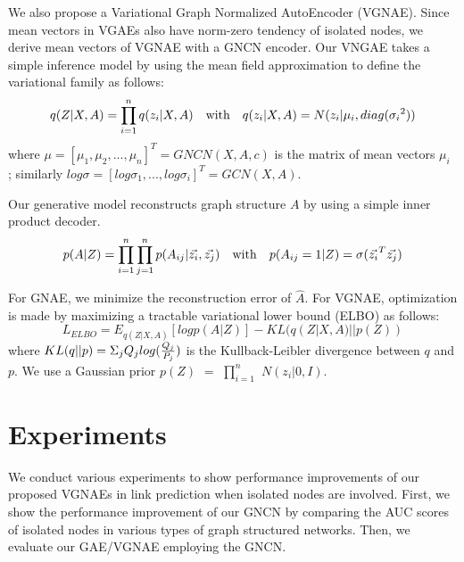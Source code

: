 \documentclass[sigconf]{acmart}
\begin{document}
We also propose a Variational Graph Normalized AutoEncoder (VGNAE).
Since mean vectors in VGAEs also have norm-zero tendency of isolated nodes, we derive mean vectors of VGNAE with a GNCN encoder.
Our VNGAE takes a simple inference model by using the mean field approximation to define the variational family as follows:
\begin{equation}
    q(Z|X,A) = \prod_{i=1}^n q(z_i | X,A) \quad {\rm with} \quad q(z_i | X,A) = N(z_i | \mu_i, diag({\sigma_i}^2))
\end{equation}
where $\mu = [\mu_1,\mu_2,...,\mu_n]^T = GNCN(X,A,c)$ is the matrix of mean vectors $\mu_i$ ; similarly $log \sigma = [log \sigma_1,...,log \sigma_i]^T = GCN(X,A)$.

Our generative model reconstructs graph structure $A$ by using a simple inner product decoder.
\begin{equation}
    p(A|Z) = \prod_{i=1}^n \prod_{j=1}^n p(A_{ij} | \vec{z_i},\vec{z_j}) \quad {\rm with} \quad  p(A_{ij}=1 | Z) = \sigma(\vec{z_i}^T \vec{z_j})
\end{equation}


For GNAE, we minimize the reconstruction error of $\hat{A}$.
For VGNAE, optimization is made by maximizing a tractable variational lower bound (ELBO) as follows:
\begin{equation}
    L_{ELBO} = E_{q(Z|X,A)}[log p(A|Z)] -  KL(q(Z|X,A) || p(Z))
\end{equation}
where $KL(q||p) = \Sigma_j Q_j log({Q_j \over P_j})$ is the Kullback-Leibler divergence between $q$ and $p$.
We use a Gaussian prior $p(Z)$ $=$ $\prod_{i=1}^n$ $N(z_i | 0,I)$.
















\section{Experiments}
We conduct various experiments to show performance improvements of our proposed VGNAEs in link prediction when isolated nodes are involved.
First, we show the performance improvement of our GNCN by comparing the AUC scores of isolated nodes in various types of graph structured networks.
Then, we evaluate our GAE/VGNAE employing the GNCN.
\end{document}
